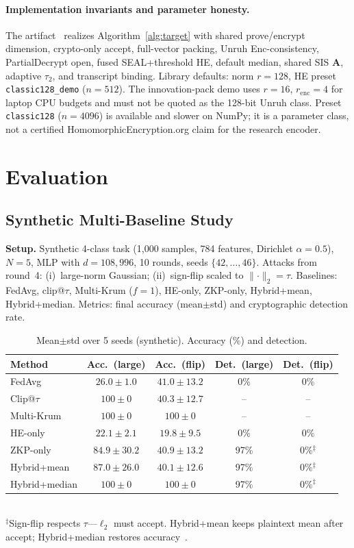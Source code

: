 \documentclass[conference]{IEEEtran}
\newcommand{\norm}[1]{\lVert #1 \rVert}
\begin{document}
\paragraph{Implementation invariants and parameter honesty.}
The artifact~\cite{zkflcode} realizes Algorithm~\ref{alg:target} with shared prove/encrypt dimension, crypto-only accept, full-vector packing, Unruh Enc-consistency, PartialDecrypt open, fused SEAL+threshold HE, default median, shared SIS $\mathbf{A}$, adaptive $\tau_2$, and transcript binding. Library defaults: norm $r{=}128$, HE preset \texttt{classic128\_demo} ($n{=}512$). The innovation-pack demo uses $r{=}16$, $r_{\mathrm{enc}}{=}4$ for laptop CPU budgets and must not be quoted as the 128-bit Unruh class. Preset \texttt{classic128} ($n{=}4096$) is available and slower on NumPy; it is a parameter class, not a certified HomomorphicEncryption.org claim for the research encoder.

\section{Evaluation}

\subsection{Synthetic Multi-Baseline Study}
\textbf{Setup.} Synthetic 4-class task (1{,}000 samples, 784 features, Dirichlet $\alpha{=}0.5$), $N{=}5$, MLP with $d{=}108{,}996$, 10 rounds, seeds $\{42,\ldots,46\}$. Attacks from round~4: (i)~large-norm Gaussian; (ii)~sign-flip scaled to $\norm{\cdot}_2=\tau$. Baselines: FedAvg, clip@$\tau$, Multi-Krum ($f{=}1$), HE-only, ZKP-only, Hybrid+mean, Hybrid+median. Metrics: final accuracy (mean$\pm$std) and cryptographic detection rate.

\begin{table}[t]
\caption{Mean$\pm$std over 5 seeds (synthetic). Accuracy (\%) and detection.}
\label{tab:res}
\centering
\scriptsize
\begin{tabular}{@{}lcccc@{}}
\toprule
Method & Acc.\ (large) & Acc.\ (flip) & Det.\ (large) & Det.\ (flip) \\
\midrule
FedAvg & $26.0{\pm}1.0$ & $41.0{\pm}13.2$ & 0\% & 0\% \\
Clip@$\tau$ & $100{\pm}0$ & $40.3{\pm}12.7$ & -- & -- \\
Multi-Krum & $100{\pm}0$ & $100{\pm}0$ & -- & -- \\
HE-only & $22.1{\pm}2.1$ & $19.8{\pm}9.5$ & 0\% & 0\% \\
ZKP-only & $84.9{\pm}30.2$ & $40.9{\pm}13.2$ & 97\% & 0\%$^{\ddagger}$ \\
Hybrid+mean & $87.0{\pm}26.0$ & $40.1{\pm}12.6$ & 97\% & 0\%$^{\ddagger}$ \\
Hybrid+median & $100{\pm}0$ & $100{\pm}0$ & 97\% & 0\%$^{\ddagger}$ \\
\bottomrule
\end{tabular}\\[1pt]
{\footnotesize $^{\ddagger}$Sign-flip respects $\tau$---$\ell_2$ must accept. Hybrid+mean keeps plaintext mean after accept; Hybrid+median restores accuracy~\cite{zkflcode}.}
\end{table}
\end{document}
